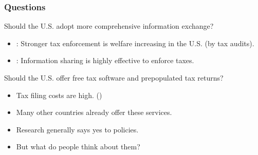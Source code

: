 \documentclass{beamer}
\begin{document}
\begin{frame}
\frametitle{Questions}
Should the U.S. adopt more comprehensive information exchange? 
\begin{itemize}
    \item \cite{boning2025welfare}: Stronger tax enforcement is welfare increasing in the U.S. (by tax audits).
    \item \cite{kleven2011unwilling,pomeranz2015no,slemrod2017does}: Information sharing is highly effective to enforce taxes. 
\end{itemize}
\vspace{1em}
Should the U.S. offer free tax software and prepopulated tax returns?
\begin{itemize}
    \item Tax filing costs are high. (\cite{IRS2022}) \\[0.2em]
    \item Many other countries already offer these services.
\end{itemize}
\vspace{1em}
\begin{itemize}
    \item[$\Rightarrow$] \alert{Research generally says yes to policies.} 
    \item[$\Rightarrow$] \alert{But what do people think about them?}
\end{itemize}
\end{frame}
\end{document}
